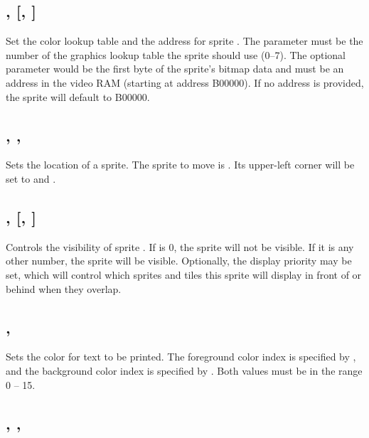 \documentclass{report}
\begin{document}
    \subsection*{ ,  [,  ]}

    Set the color lookup table and the address for sprite .
    The parameter  must be the number of the graphics lookup table the
    sprite should use (0--7).
    The optional parameter  would be the first byte of the sprite's
    bitmap data and must be an address in the video RAM (starting at address B00000).
    If no address is provided, the sprite will default to B00000.

    \subsection*{ , , }

    Sets the location of a sprite.
    The sprite to move is .
    Its upper-left corner will be set to  and .

    \subsection*{ ,  [,  ]}

    Controls the visibility of sprite .
    If  is 0, the sprite will not be visible.
    If it is any other number, the sprite will be visible.
    Optionally, the display priority  may be set, which will control
    which sprites and tiles this sprite will display in front of or behind when
    they overlap.

    \subsection*{ , }

    Sets the color for text to be printed.
    The foreground color index is specified by ,
    and the background color index is specified by .
    Both values must be in the range 0 -- 15.

    \subsection*{ , , }
\end{document}
